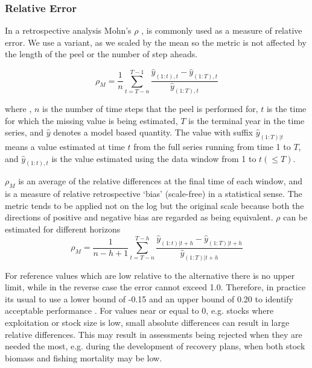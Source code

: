 \documentclass[12pt,halfline,a4paper,nonumbib]{ouparticle}
\newcommand{\disp}{\displaystyle}
\begin{document}

\subsubsection{Relative Error}
 
In a retrospective analysis Mohn's $\rho$ \parencite{mohn1999retrospective}, is commonly used as a measure of relative error. We use a variant, as we scaled by the mean so the metric is not affected by the length of the peel or the number of step aheads.

\begin{equation}
\label{eqn:mohn}
\rho_{M} = \disp \frac{1}{n} \sum_{t=T-n}^{T-1} \frac{\hat{y}_{(1:t),t}-\hat{y}_{(1:T),t}}{\hat{y}_{(1:T),t}} 
\end{equation}

\noindent
where , $n$ is the number of time steps that the peel is performed for, $t$ is the time for which the missing value is being estimated, $T$ is the terminal year in the time series, and $\hat{y}$ denotes a model based quantity. The value with suffix $\hat{y}_{(1:T)|t}$ means a value estimated at time $t$ from the full series running from time 1 to $T$, and $\hat{y}_{(1:t),t}$ is the value estimated using the data window from 1 to $t (\leq T)$. 

$\rho_M$ is an average of the relative differences at the final time of each window, and is a measure of relative retrospective `bias' (scale-free) in a statistical sense. The metric tends to be applied not on the log but the original scale because both the directions of positive and negative bias are regarded as being equivalent. $\rho$ can be estimated for different horizons 
\begin{equation}
\label{eqn:mohn}
\rho_{M} = \disp \frac{1}{n-h+1} \sum_{t=T-n}^{T-h} \frac{\hat{y}_{(1:t)|t+h}-\hat{y}_{(1:T)|t+h}}{\hat{y}_{(1:T)|t+h}} 
\end{equation}

For reference values which are low relative to the alternative there is no upper limit, while in the reverse case the error cannot exceed 1.0. Therefore, in practice its usual to use a lower bound of -0.15 and an upper bound of 0.20 to identify acceptable performance \parencite{hurtado2014looking}. For values near or equal to 0, e.g. stocks where exploitation or stock size is low, small absolute differences can result in large relative differences.  This may result in assessments being rejected when they are needed the most, e.g. during the development of recovery plans, when both stock biomass and fishing mortality may be low. 
\end{document}

